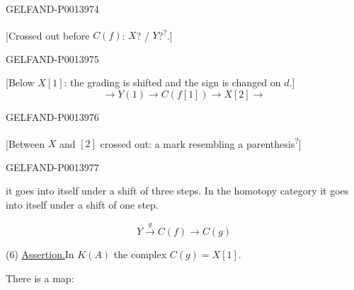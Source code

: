 \begin{GelfandAdjacentEvidence}{GELFAND-P001397}{4}

[Crossed out before \(C(f)\):
\(X\)? / \(Y\)?\textsuperscript{?}.]
\end{GelfandAdjacentEvidence}
\begin{GelfandAdjacentEvidence}{GELFAND-P001397}{5}

[Below \(X[1]\): the grading is shifted and the sign is changed on \(d\).]
\[
\longrightarrow Y(1)\longrightarrow C(f[1])\longrightarrow X[2]\longrightarrow
\]
\end{GelfandAdjacentEvidence}
\begin{GelfandAdjacentEvidence}{GELFAND-P001397}{6}

[Between \(X\) and \([2]\) crossed out:
a mark resembling a parenthesis\textsuperscript{?}]
\end{GelfandAdjacentEvidence}
\begin{GelfandAdjacentEvidence}{GELFAND-P001397}{7}


it goes into itself under a shift of three steps.
In the homotopy category it goes into itself under a shift of one step.

\begin{equation*}
Y\overset{g}{\longrightarrow}C(f)\longrightarrow C(g)
\tag{5}
\end{equation*}

(6) \uline{Assertion.}\quad In \(K(A)\) the complex \(C(g)=X[1]\).

There is a map:
\end{GelfandAdjacentEvidence}



